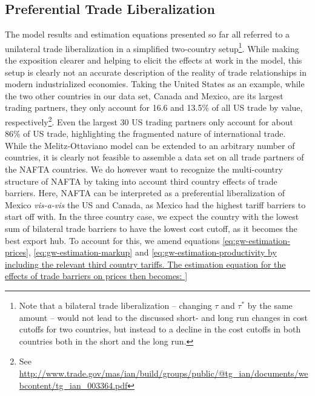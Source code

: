 \documentclass[a4paper,12pt]{article}
\begin{document}
\subsection{Preferential Trade Liberalization}
The model results and estimation equations presented so far all referred to a unilateral trade liberalization in a simplified two-country setup\footnote{Note that a bilateral trade liberalization -- changing $\tau$ and $\tau^*$ by the same amount -- would not lead to the discussed short- and long run changes in cost cutoffs for two countries, but instead to a decline in the cost cutoffs in both countries both in the short and the long run.}. While making the exposition clearer and helping to elicit the effects at work in the model, this setup is clearly not an accurate description of the reality of trade relationships in modern industrialized economies. Taking the United States as an example, while the two other countries in our data set, Canada and Mexico, are its largest trading partners, they only account for 16.6 and 13.5\% of all US trade by value, respectively\footnote{See \href{Top U.S. Trade Partners, U.S. International Trade Administration}{http://www.trade.gov/mas/ian/build/groups/public/@tg_ian/documents/webcontent/tg_ian_003364.pdf}}. Even the largest 30 US trading partners only account for about 86\% of US trade, highlighting the fragmented nature of international trade. While the Melitz-Ottaviano model can be extended to an arbitrary number of countries, it is clearly not feasible to assemble a data set on all trade partners of the NAFTA countries. We do however want to recognize the multi-country structure of NAFTA by taking into account third country effects of trade barriers. Here, NAFTA can be interpreted as a preferential liberalization of Mexico \textit{vis-a-vis} the US and Canada, as Mexico had the highest tariff barriers to start off with. In the three country case, we expect the country with the lowest sum of bilateral trade barriers to have the lowest cost cutoff, as it becomes the best export hub. To account for this, we amend equations \ref{eq:gw-estimation-prices}, \ref{eq:gw-estimation-markup} and \ref{eq:gw-estimation-productivity by including the relevant third country tariffs. The estimation equation for the effects of trade barriers on prices then becomes:

}
\end{document}
